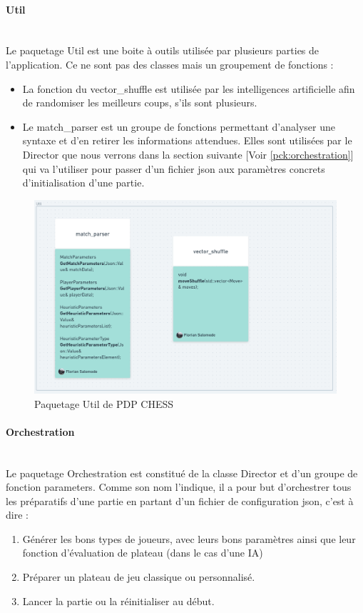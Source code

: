 \documentclass{article}
\begin{document}
\paragraph{Util}
~~\\
\newline
Le paquetage Util est une boite à outils utilisée par plusieurs parties de l'application. Ce ne sont pas des classes mais un groupement de fonctions :
\begin{itemize}
    \item La fonction du vector\_shuffle est utilisée par les intelligences artificielle afin de randomiser les meilleurs coups, s'ils sont plusieurs.
    \item Le match\_parser est un groupe de fonctions permettant d'analyser une syntaxe et d'en retirer les informations attendues. Elles sont utilisées par le Director que nous verrons dans la section suivante [Voir \ref{pck:orchestration}] qui va l'utiliser pour passer d'un fichier json aux paramètres concrets d'initialisation d'une partie.
\end{itemize}
\begin{figure}[!h]
    \centering
    \includegraphics[scale = 0.3]{img/Package/Util.png}
    \caption{Paquetage Util de PDP CHESS}
    \label{pck:util}
\end{figure}
\newpage
\paragraph{Orchestration}
~~\\
\newline
Le paquetage Orchestration est constitué de la classe Director et d'un groupe de fonction parameters. Comme son nom l'indique, il a pour but d'orchestrer tous les préparatifs d'une partie en partant d'un fichier de configuration json, c'est à dire :
\begin{enumerate}
    \item Générer les bons types de joueurs, avec leurs bons paramètres ainsi que leur fonction d'évaluation de plateau (dans le cas d'une IA)
    \item Préparer un plateau de jeu classique ou personnalisé.
    \item Lancer la partie ou la réinitialiser au début.
\end{enumerate}
\end{document}
